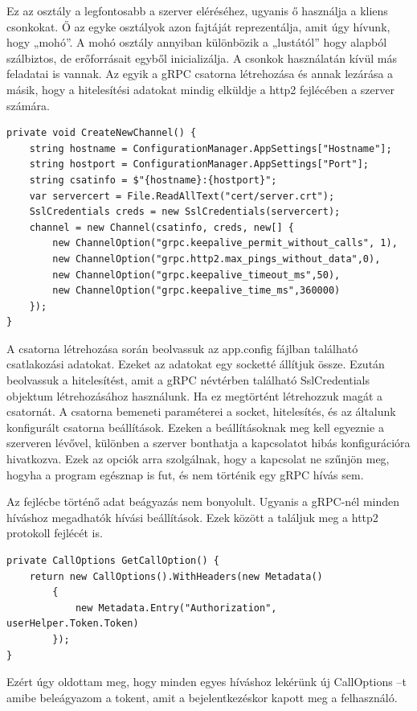 \documentclass[
]{thesis-ekf}
\theoremstyle{definition}
\theoremstyle{remark}
\begin{document}
Ez az osztály a legfontosabb a szerver eléréséhez, ugyanis ő használja a kliens csonkokat. Ő az egyke osztályok azon fajtáját reprezentálja, amit úgy hívunk, hogy „mohó”. A mohó osztály annyiban különbözik a „lustától” hogy alapból szálbiztos, de erőforrásait egyből inicializálja. A csonkok használatán kívül más feladatai is vannak. Az egyik a gRPC csatorna létrehozása és annak lezárása a másik, hogy a hitelesítési adatokat mindig elküldje a http2 fejlécében a szerver számára.
\begin{lstlisting}[showstringspaces=false,caption={gRPC csatorna készítése.},captionpos=b]
private void CreateNewChannel() {
	string hostname = ConfigurationManager.AppSettings["Hostname"];
	string hostport = ConfigurationManager.AppSettings["Port"];
	string csatinfo = $"{hostname}:{hostport}";
	var servercert = File.ReadAllText("cert/server.crt");
	SslCredentials creds = new SslCredentials(servercert);
	channel = new Channel(csatinfo, creds, new[] {
		new ChannelOption("grpc.keepalive_permit_without_calls", 1),
		new ChannelOption("grpc.http2.max_pings_without_data",0),
		new ChannelOption("grpc.keepalive_timeout_ms",50),
		new ChannelOption("grpc.keepalive_time_ms",360000)
	});
}
\end{lstlisting}
A csatorna létrehozása során beolvassuk az app.config fájlban található csatlakozási adatokat. Ezeket az adatokat egy socketté állítjuk össze. Ezután beolvassuk a hitelesítést, amit a gRPC névtérben található SslCredentials objektum létrehozásához használunk. Ha ez megtörtént létrehozzuk magát a csatornát. A csatorna bemeneti paraméterei a socket, hitelesítés, és az általunk konfigurált csatorna beállítások. Ezeken a beállításoknak meg kell egyeznie a szerveren lévővel, különben a szerver bonthatja a kapcsolatot hibás konfigurációra hivatkozva. Ezek az opciók arra szolgálnak, hogy a kapcsolat ne szűnjön meg, hogyha a program egésznap is fut, és nem történik egy gRPC hívás sem.

Az fejlécbe történő adat beágyazás nem bonyolult. Ugyanis a gRPC-nél minden híváshoz megadhatók hívási beállítások. Ezek között a találjuk meg a http2 protokoll fejlécét is.
\begin{lstlisting}[showstringspaces=false,caption={CallOption beállítása.},captionpos=b]
private CallOptions GetCallOption() {
	return new CallOptions().WithHeaders(new Metadata()
		{
			new Metadata.Entry("Authorization", userHelper.Token.Token)
		});
}
\end{lstlisting}
Ezért úgy oldottam meg, hogy minden egyes híváshoz lekérünk új CallOptions –t amibe beleágyazom a tokent, amit a bejelentkezéskor kapott meg a felhasználó. 
\end{document}
